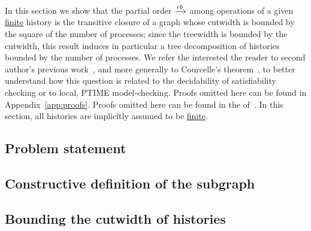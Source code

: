 In this section we show that the partial order $\xrightarrow{rb}$ among operations of a
given \underline{finite} history is the transitive closure of a graph whose cutwidth is bounded
by the square of the number of processes; since the treewidth is bounded
by the cutwidth, this result induces in particular a tree decomposition of
histories bounded by the number of processes. We refer the interested the reader to
second author’s previous work~\cite{DBLP:journals/pacmpl/GiustoFLL23}, and more generally to Courcelle's theorem~\cite{Courcelle10}, to better understand how this question is related to the decidability of satisfiability checking or to local, PTIME model-checking. 
\iflong
Proofs omitted here can be found in Appendix~\ref{app:proofs}.
\else
Proofs omitted here can be found in the of~\cite{coget2026histmsologicreasoningconsistency}.
\fi
In this section, all histories are implicitly assumed to be \underline{finite}.

\subsection{Problem statement}\label{sec:graphs-finite-histories}


\subsection{Constructive definition of the subgraph}


\subsection{Bounding the cutwidth of histories}

